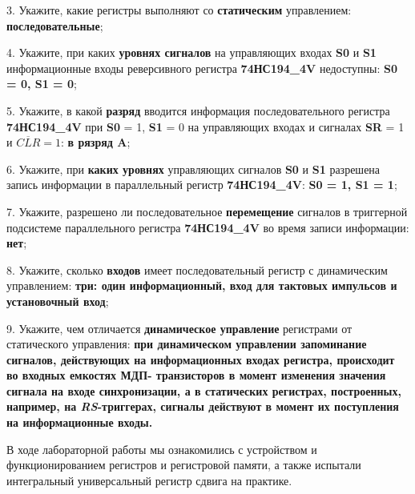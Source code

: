 \documentclass[spec, och, otchet, hidelinks]{SCWorks}
\begin{document}
\par 3. Укажите, какие регистры выполняют со \textbf{статическим} управлением: \textbf{последовательные};

\par 4. Укажите, при каких \textbf{уровнях сигналов} на управляющих входах \textbf{S0} и \textbf{S1} информационные входы реверсивного регистра 
\textbf{74НС194\_4V} недоступны: \textbf{S0 = 0, S1 = 0};

\par 5. Укажите, в какой \textbf{разряд} вводится информация последовательного регистра \textbf{74НС194\_4V} при \textbf{S0} = 1, \textbf{S1} = 0 на 
управляющих входах и сигналах \textbf{SR} = 1 и $ \overline{CLR} = 1 $: \textbf{в рязряд A};

\par 6. Укажите, при \textbf{каких уровнях} управляющих сигналов \textbf{S0} и \textbf{S1} разрешена запись информации в параллельный регистр 
\textbf{74НС194\_4V}: \textbf{S0 = 1, S1 = 1};

\par 7. Укажите, разрешено ли последовательное \textbf{перемещение} сигналов в триггерной подсистеме параллельного регистра \textbf{74НС194\_4V} во 
время записи информации: \textbf{нет};

\par 8. Укажите, сколько \textbf{входов} имеет последовательный регистр с динамическим управлением: \textbf{три: один информационный, вход для тактовых импульсов и установочный вход};

\par 9. Укажите, чем отличается \textbf{динамическое управление} регистрами от статического
управления: \textbf{при динамическом управлении запоминание сигналов, действующих на информационных входах регистра, происходит во входных емкостях \textbf{МДП}-
транзисторов в момент изменения значения сигнала на входе синхронизации, а в статических регистрах, построенных, например, на \textit{RS}-триггерах, 
сигналы действуют в момент их поступления на информационные входы.}

\newpage

\conclusion

\par В ходе лабораторной работы мы ознакомились с устройством и функционированием регистров и регистровой памяти, а также испытали интегральный 
универсальный регистр сдвига на практике. 
\end{document}
